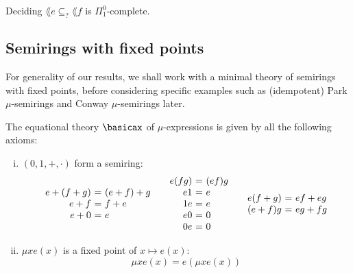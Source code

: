 \documentclass[runningheads]{amsart}
\begin{document}
\begin{proposition}
    Deciding $\lang e \subseteq_? \lang f$ is $\Pi^0_1$-complete.
\end{proposition}

\subsection{Semirings with fixed points}
For generality of our results, we shall work with a minimal theory of semirings with fixed points, before considering specific examples such as (idempotent) Park $\mu$-semirings and Conway $\mu$-semirings later.

\begin{definition}
    The equational theory $\basicax$ of $\mu$-expressions is given by all the following axioms:
    \begin{enumerate}[(i)]
    \item $(0,1,+,\cdot) $ form a semiring:
    \[
    \begin{array}{r@{\ = \ }l}
         e + (f+g) & (e+f)+g \\
         e+f & f + e\\
         e+0 & e 
    \end{array}
    \quad
    \begin{array}{r@{\ = \ }l}
         e (fg) & (ef)g \\
         e1 & e \\
         1 e & e \\
         e0 & 0 \\
         0e & 0
    \end{array}
    \quad
    \begin{array}{r@{\ = \ }l}
         e(f+g) & ef + eg \\
         (e+f)g & eg + fg
    \end{array}
    \]
    \item\label{item:fixed-point-axioms} $\mu x e(x)$ is a fixed point of $ x \mapsto e(x)$:
    \[
    \mu x e(x) = e (\mu x e(x))
    \]
    \end{enumerate}
\end{definition}
\end{document}
